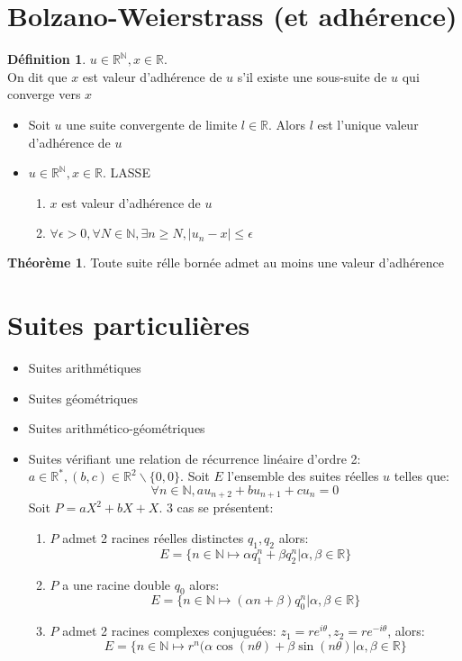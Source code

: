 \documentclass[fleqn]{article}
\theoremstyle{definition} \newtheorem*{defi}{D\'efinition}
\theoremstyle{definition} \newtheorem*{theo}{Th\'eor\`eme}
\begin{document}
\section{Bolzano-Weierstrass (et adh\'erence)}
\begin{defi}
	$u \in \mathbb{R}^\mathbb{N}, x \in \mathbb{R}$. \\
	On dit que $x$ est valeur d'adh\'erence de $u$ s'il existe une sous-suite de $u$ qui converge vers $x$
\end{defi}
\begin{itemize}
	\item Soit $u$ une suite convergente de limite $l \in \mathbb{R}$. Alors $l$ est l'unique valeur d'adh\'erence de $u$
	\item $u \in \mathbb{R}^\mathbb{N}, x \in \mathbb{R}$. LASSE
	\begin{enumerate}
		\item $x$ est valeur d'adh\'erence de $u$
		\item $\forall \epsilon > 0, \forall N \in \mathbb{N}, \exists n \geq N, |u_n - x| \leq \epsilon$
	\end{enumerate}
\end{itemize}

\begin{theo}
	Toute suite r\'elle born\'ee admet au moins une valeur d'adh\'erence
\end{theo}

\section{Suites particuli\`eres}
\begin{itemize}
	\item Suites arithm\'etiques
	\item Suites g\'eom\'etriques
	\item Suites arithm\'etico-g\'eom\'etriques
	\item Suites v\'erifiant une relation de r\'ecurrence lin\'eaire d'ordre 2: \\
		$a \in \mathbb{R}^*, (b,c) \in \mathbb{R}^2\backslash\{0,0\}$. Soit $E$ l'ensemble des suites r\'eelles $u$ telles que:
		\[\forall n \in \mathbb{N}, au_{n+2} + bu_{n+1} + cu_n = 0\]
		Soit $P = aX^2 + bX + X$. 3 cas se pr\'esentent:
		\begin{enumerate}
			\item $P$ admet 2 racines r\'eelles distinctes $q_1, q_2$ alors:
				\[E = \{n \in \mathbb{N} \mapsto \alpha q_1^n + \beta q_2^n | \alpha, \beta \in \mathbb{R}\}\]
			\item $P$ a une racine double $q_0$ alors:
				\[E = \{n \in \mathbb{N} \mapsto (\alpha n + \beta) q_0^n | \alpha, \beta \in \mathbb{R}\}\]
			\item $P$ admet 2 racines complexes conjugu\'ees: $z_1 = re^{i\theta}, z_2 = re^{-i\theta}$, alors:
				\[E = \{n \in \mathbb{N} \mapsto r^n(\alpha \cos(n\theta) + \beta \sin(n\theta) | \alpha, \beta \in \mathbb{R}\}\]
		\end{enumerate}
\end{itemize}
\end{document}
